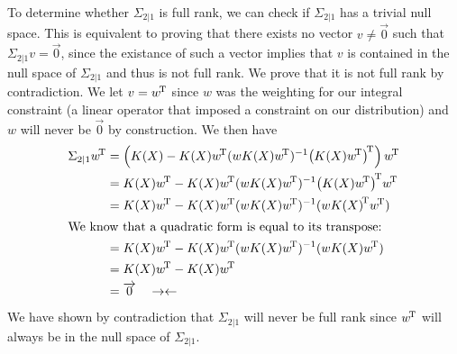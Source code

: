 To determine whether $\Sigma_{2|1}$ is full rank, we can check if $\Sigma_{2 | 1}$
has a trivial null space. This is equivalent to proving that there exists no
vector $v \ne \overrightarrow{0}$ such that $\Sigma_{2 | 1} v = \overrightarrow{0}$, since the existance of such a vector
implies that $v$ is contained in the null space of $\Sigma_{2 | 1}$ and thus is not full rank.
We prove that it is not full rank by contradiction. We let $v={w}^{\!\text{T}}$ since
$w$ was the weighting for our integral constraint (a linear operator that imposed a
constraint on our distribution) and $w$ will never be $\overrightarrow{0}$ by construction. We then have
\begin{align}
  \Sigma_{2|1} \tp{w}
  &= \left(K(X) - K(X) \tp{w} (wK(X)\tp{w})^{-1} \tp{\left(K(X)\tp{w}\right)}\right) \tp{w} \\
  &= K(X)\tp{w} - K(X) \tp{w} (wK(X)\tp{w})^{-1} \tp{\left(K(X)\tp{w}\right)} \tp{w} \\
  &= K(X)\tp{w} - K(X) \tp{w} (wK(X)\tp{w})^{-1} (w\tp{K(X)} \tp{w}) \\
  \intertext{We know that a quadratic form is equal to its transpose:}
  &= K(X)\tp{w} - K(X) \tp{w} (wK(X)\tp{w})^{-1} (wK(X) \tp{w}) \\
  &= K(X)\tp{w} - K(X) \tp{w}\\
  &= \overrightarrow{0}\quad \rightarrow \leftarrow
\end{align}
We have shown by contradiction that $\Sigma_{2|1}$ will never be full rank since ${w}^{\!\text{T}}$ will 
always be in the null space of $\Sigma_{2|1}$. 
